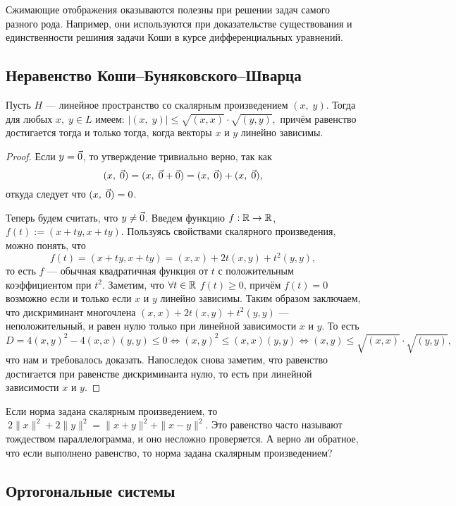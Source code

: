 Сжимающие отображения оказываются полезны при решении задач самого разного рода. Например, они используются при доказательстве существования и единственности решиния задачи Коши в курсе дифференциальных уравнений. 

\subsection{Неравенство Коши--Буняковского--Шварца}

\begin{Theorem}
	Пусть $H$ --- линейное пространство со скалярным произведением $(x,\;y)$.
	Тогда для любых $x,\;y\in L$ имеем: $|( x,\;y) | \leqslant  \sqrt{(x, x)}\cdot \sqrt{(y, y)},$ причём равенство достигается тогда и только тогда, когда векторы $x$ и $y$ линейно зависимы.
\end{Theorem}
\begin{proof}
	Если $y = \vec{0}$, то утверждение тривиально верно, так как $$ ( x,\;\vec{0}) = ( x,\;\vec{0}+\vec{0}) = ( x,\;\vec{0})+( x,\;\vec{0}),$$
	откуда следует что $( x,\;\vec{0}) = 0$.
	
	Теперь будем считать, что $y\neq \vec{0}$. Введем функцию $f: \mathbb{R} \rightarrow\mathbb{R}$, $f(t):=(x+ty, x+ty)$. Пользуясь свойствами скалярного произведения, можно понять, что 
    $$ f(t) =(x+ty, x+ty) = (x, x)+2t(x, y)+t^2(y, y),$$ 
    то есть $f$ --- обычная квадратичная функция от $t$ с положительным коэффициентом при $t^2$. Заметим, что $\forall t\in\mathbb{R}$ $f(t)\geq0$, причём $f(t)=0$ возможно если и только если $x$ и $y$ линейно зависимы. Таким образом заключаем, что дискриминант многочлена $(x, x)+2t(x, y)+t^2(y, y)$ --- неположительный, и равен нулю только при линейной зависимости $x$ и $y$. То есть 
	\[D = 4(x, y)^2-4(x, x)(y, y)\leqslant 0 \Leftrightarrow (x, y)^2\leq(x, x)(y, y) \Leftrightarrow (x, y)\leqslant \sqrt{(x, x)}\cdot \sqrt{(y, y)},\]
	что нам и требовалось доказать. Напоследок снова заметим, что равенство достигается при равенстве дискриминанта нулю, то есть при линейной зависимости $x$ и $y$.
\end{proof}
\begin{Task}
	Если норма задана скалярным произведением, то 
	$\ 2\|x\|^2+2\|y\|^2=\|x+y\|^2+\|x-y\|^2$. Это равенство часто называют тождеством параллелограмма, и оно несложно проверяется. А верно ли обратное, что если выполнено равенство, то норма задана скалярным произведением?
\end{Task}

\subsection{Ортогональные системы}


